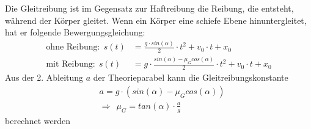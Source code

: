\documentclass[11pt, a4paper]{article}
\begin{document}
    Die Gleitreibung ist im Gegensatz zur Haftreibung die Reibung, die entsteht, während der Körper gleitet.
    Wenn ein Körper eine schiefe Ebene hinuntergleitet, hat er folgende Bewergungsgleichung:
    \begin{align}
        \text{ohne Reibung:} \ \  s(t) &= \frac{g \cdot sin(\alpha)}{2} \cdot t^2 +v_0 \cdot t + x_0 \\
        \text{mit Reibung:} \ \  s(t) &= g \cdot \frac{sin(\alpha) -\mu_G cos(\alpha)}{2} \cdot t^2 +v_0 \cdot t + x_0
    \end{align}
    Aus der 2. Ableitung $a$ der Theorieparabel kann die Gleitreibungskonstante
    \begin{align}
        &a = g \cdot (sin(\alpha) - \mu_G cos(\alpha)) \\
        &\Rightarrow \ \ \mu_G = tan(\alpha) \cdot \frac{a}{g}
    \end{align} 
    berechnet werden




    
    
\end{document}
